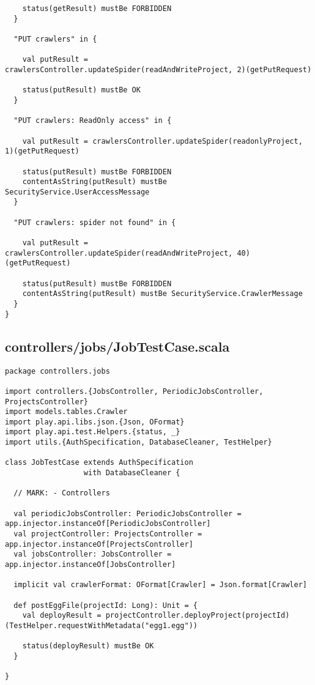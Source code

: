\begin{lstlisting}
    status(getResult) mustBe FORBIDDEN
  }

  "PUT crawlers" in {

    val putResult = crawlersController.updateSpider(readAndWriteProject, 2)(getPutRequest)

    status(putResult) mustBe OK
  }

  "PUT crawlers: ReadOnly access" in {

    val putResult = crawlersController.updateSpider(readonlyProject, 1)(getPutRequest)

    status(putResult) mustBe FORBIDDEN
    contentAsString(putResult) mustBe SecurityService.UserAccessMessage
  }

  "PUT crawlers: spider not found" in {

    val putResult = crawlersController.updateSpider(readAndWriteProject, 40)(getPutRequest)

    status(putResult) mustBe FORBIDDEN
    contentAsString(putResult) mustBe SecurityService.CrawlerMessage
  }
}
\end{lstlisting}
\subsection{controllers/jobs/JobTestCase.scala}
\begin{lstlisting}
package controllers.jobs

import controllers.{JobsController, PeriodicJobsController, ProjectsController}
import models.tables.Crawler
import play.api.libs.json.{Json, OFormat}
import play.api.test.Helpers.{status, _}
import utils.{AuthSpecification, DatabaseCleaner, TestHelper}

class JobTestCase extends AuthSpecification
                  with DatabaseCleaner {

  // MARK: - Controllers

  val periodicJobsController: PeriodicJobsController = app.injector.instanceOf[PeriodicJobsController]
  val projectController: ProjectsController = app.injector.instanceOf[ProjectsController]
  val jobsController: JobsController = app.injector.instanceOf[JobsController]

  implicit val crawlerFormat: OFormat[Crawler] = Json.format[Crawler]

  def postEggFile(projectId: Long): Unit = {
    val deployResult = projectController.deployProject(projectId)(TestHelper.requestWithMetadata("egg1.egg"))

    status(deployResult) mustBe OK
  }

}
\end{lstlisting}
